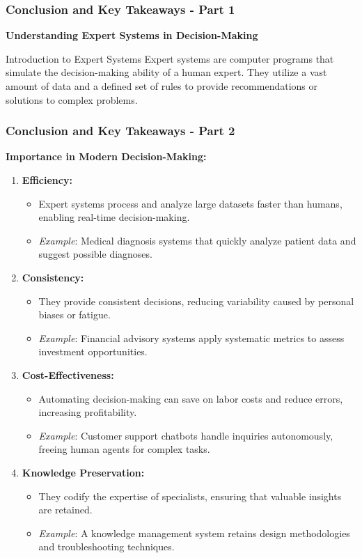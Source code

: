 \documentclass[aspectratio=169]{beamer}
\begin{document}
\begin{frame}[fragile]
    \frametitle{Conclusion and Key Takeaways - Part 1}
    \textbf{Understanding Expert Systems in Decision-Making}

    \begin{block}{Introduction to Expert Systems}
        Expert systems are computer programs that simulate the decision-making ability of a human expert. They utilize a vast amount of data and a defined set of rules to provide recommendations or solutions to complex problems.
    \end{block}
\end{frame}

\begin{frame}[fragile]
    \frametitle{Conclusion and Key Takeaways - Part 2}
    \textbf{Importance in Modern Decision-Making:}

    \begin{enumerate}
        \item \textbf{Efficiency:}
        \begin{itemize}
            \item Expert systems process and analyze large datasets faster than humans, enabling real-time decision-making.
            \item \textit{Example}: Medical diagnosis systems that quickly analyze patient data and suggest possible diagnoses.
        \end{itemize}

        \item \textbf{Consistency:}
        \begin{itemize}
            \item They provide consistent decisions, reducing variability caused by personal biases or fatigue.
            \item \textit{Example}: Financial advisory systems apply systematic metrics to assess investment opportunities.
        \end{itemize}

        \item \textbf{Cost-Effectiveness:}
        \begin{itemize}
            \item Automating decision-making can save on labor costs and reduce errors, increasing profitability.
            \item \textit{Example}: Customer support chatbots handle inquiries autonomously, freeing human agents for complex tasks.
        \end{itemize}

        \item \textbf{Knowledge Preservation:}
        \begin{itemize}
            \item They codify the expertise of specialists, ensuring that valuable insights are retained.
            \item \textit{Example}: A knowledge management system retains design methodologies and troubleshooting techniques.
        \end{itemize}
    \end{enumerate}
\end{frame}
\end{document}
